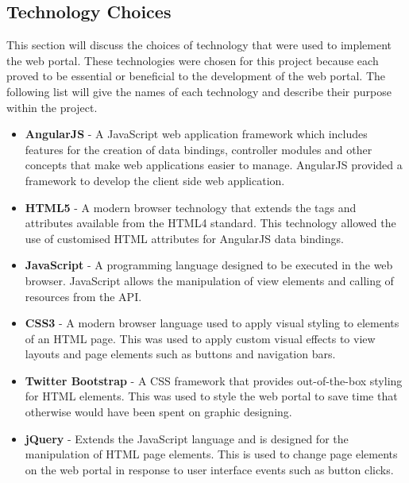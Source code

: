 \documentclass[11pt,a4paper]{report}
\begin{document}
\subsection{Technology Choices}

\label{sec:portal-technology-choices}



This section will discuss the choices of technology that were used to implement the web portal. These technologies were chosen for this project because each proved to be essential or beneficial to the development of the web portal. The following list will give the names of each technology and describe their purpose within the project.



\begin{itemize}

\item \textbf{AngularJS} - A JavaScript web application framework which includes features for the creation of data bindings, controller modules and other concepts that make web applications easier to manage. AngularJS provided a framework to develop the client side web application.

\item \textbf{HTML5} - A modern browser technology that extends the tags and attributes available from the HTML4 standard. This technology allowed the use of customised HTML attributes for AngularJS data bindings.

\item \textbf{JavaScript} - A programming language designed to be executed in the web browser. JavaScript allows the manipulation of view elements and calling of resources from the API.

\item \textbf{CSS3} - A modern browser language used to apply visual styling to elements of an HTML page. This was used to apply custom visual effects to view layouts and page elements such as buttons and navigation bars.

\item \textbf{Twitter Bootstrap} - A CSS framework that provides out-of-the-box styling for HTML elements. This was used to style the web portal to save time that otherwise would have been spent on graphic designing.

\item \textbf{jQuery} - Extends the JavaScript language and is designed for the manipulation of HTML page elements. This is used to change page elements on the web portal in response to user interface events such as button clicks.

\end{itemize}
\end{document}
